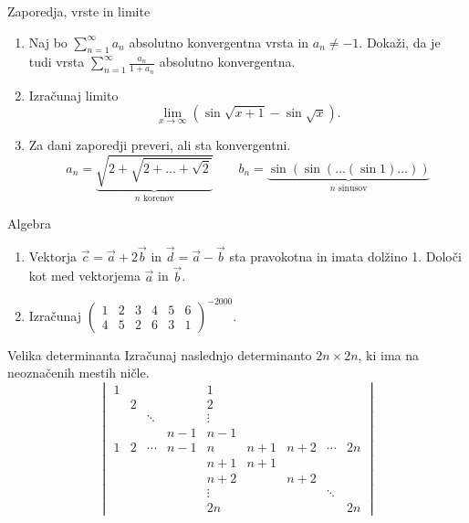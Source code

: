 \begin{frame}{Zaporedja, vrste in limite}
	\begin{enumerate}
		\item 
		Naj bo \(\sum_{n=1}^{\infty} a_n\) absolutno konvergentna vrsta in $a_n \ne -1$.
		Dokaži, da je tudi vrsta $\sum_{n=1}^\infty \frac{a_n}{1+a_n}$
		absolutno konvergentna.

		\item
		Izračunaj limito
		\[\lim_{x\rightarrow \infty} (\sin \sqrt{x+1} - \sin \sqrt{x}).\]

		\item
		Za dani zaporedji preveri, ali sta konvergentni.
		\[a_n = \underbrace{\sqrt{2+\sqrt{2+\dots+\sqrt{2}}}}_\text{$n$ korenov} \qquad
		b_n = \underbrace{\sin(\sin(\dots(\sin 1)\dots))}_\text{$n$ sinusov}\]
	\end{enumerate}
\end{frame}

\begin{frame}{Algebra}
	\begin{enumerate}
		\item
		Vektorja \(\vec{c}=\vec{a}+2\vec{b}\) in \(\vec{d}=\vec{a}-\vec{b}\)
		sta pravokotna in imata dolžino 1. Določi kot med vektorjema $\vec{a}$ in $\vec{b}$.
		\item 
		Izračunaj
		\(
		\begin{pmatrix}
			1&2&3&4&5&6 \\
			4&5&2&6&3&1
		\end{pmatrix}^{-2000}.\)
	\end{enumerate}
\end{frame}

\begin{frame}{Velika determinanta}
	Izračunaj naslednjo determinanto $2n \times 2n$, ki ima na neoznačenih mestih ničle.
	\[
	\begin{vmatrix}
		1 &&&& 1 &&&& \\
		& 2 &&& 2 &&&& \\
		&& \ddots && \vdots &&&& \\
		&&& n-1 & n-1 &&&& \\
		1 & 2 & \cdots & n-1 & n & n+1 & n+2 & \cdots & 2n \\
		&&&& n+1 & n+1 &&& \\
		&&&& n+2 && n+2 && \\
		&&&& \vdots &&& \ddots & \\
		&&&& 2n &&&& 2n
	\end{vmatrix}\]
\end{frame}

